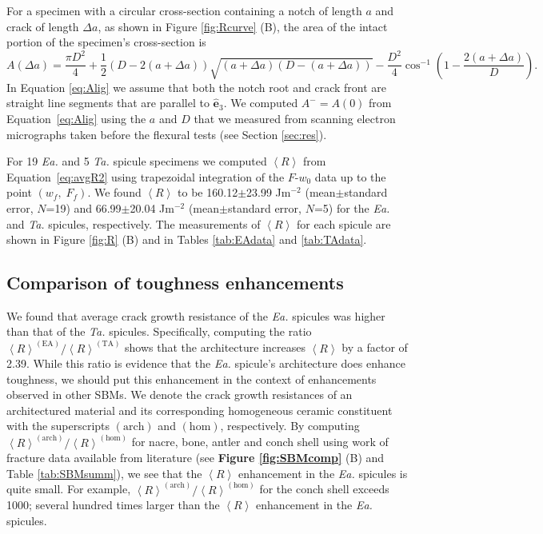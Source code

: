 \documentclass[12pt,onecolumn]{article}
\makeatletter
\newcommand{\ez}{{\bm{\hat{e}}}_3}
\newcommand{\TA}{\textit{Ta.\@}\xspace}
\newcommand{\EA}{\textit{Ea.\@}\xspace}
\makeatother
\begin{document}
\begin{bibunit}
For a specimen with a circular cross-section containing a notch of length $a$ and crack of length $\Delta a$, as shown in Figure \ref{fig:Rcurve} (B), the area of the intact portion of the specimen's cross-section is
%
\begin{equation}
    \label{eq:Alig}
    A(\Delta a)=\frac{\pi D^2}{4}+\frac{1}{2}\left(D-2(a+\Delta a)\right)\sqrt{(a+\Delta a)(D-(a+\Delta a))}-\frac{D^2}{4}\cos^{-1}\left(1-\frac{2(a+\Delta a)}{D}\right).
\end{equation}
%
In Equation \eqref{eq:Alig} we assume that both the notch root and crack front are straight line segments that are parallel to $\ez$. We computed $A^-=A(0)$ from Equation~\eqref{eq:Alig} using the $a$ and $D$ that we measured from scanning electron micrographs taken before the flexural tests (see Section \ref{sec:res}).

For 19 \EA and 5 \TA spicule specimens we computed $\left< R\right>$ from Equation~\eqref{eq:avgR2} using trapezoidal integration of the $F$-$w_0$ data up to the point $(w_f, \; F_f)$. We found  $\left< R \right>$ to be 160.12$\pm$23.99 Jm$^{-2}$ (mean$\pm$standard error, $N$=19) and 66.99$\pm$20.04 Jm$^{-2}$ (mean$\pm$standard error, $N$=5) for the \EA and \TA spicules, respectively. The measurements of $\left< R \right>$ for each spicule are shown in Figure \ref{fig:R} (B) and in Tables \ref{tab:EAdata} and \ref{tab:TAdata}.

\subsection{Comparison of toughness enhancements}
\label{sec:Rcomp}
We found that average crack growth resistance of the \EA spicules was higher than that of the \TA spicules. Specifically, computing the ratio $\left< R\right>^{(\mathrm{EA})}/\left< R\right>^{(\mathrm{TA})}$ shows that the architecture increases $\left< R\right>$ by a factor of 2.39. While this ratio is evidence that the \EA spicule's architecture does enhance toughness, we should put this enhancement in the context of enhancements observed in other SBMs. We denote the crack growth resistances of an architectured material and its corresponding homogeneous ceramic constituent with the superscripts $(\mathrm{arch})$ and $(\mathrm{hom})$, respectively. By computing $\left< R\right>^{(\mathrm{arch})}/\left< R\right>^{(\mathrm{hom})}$ for nacre, bone, antler and conch shell using work of fracture data available from literature (see {\bf Figure \ref{fig:SBMcomp}} (B) and Table \ref{tab:SBMsumm}), we see that the $\left< R \right>$ enhancement in the \EA spicules is quite small. For example, $\left< R\right>^{(\mathrm{arch})}/\left< R\right>^{(\mathrm{hom})}$ for the conch shell exceeds 1000; several hundred times larger than the $\left< R \right>$ enhancement in the \EA spicules.


\end{bibunit}
\end{document}
